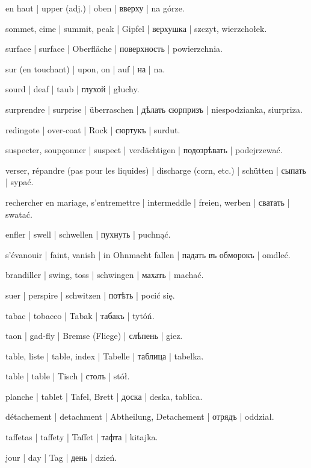 \begin{outdent}{1em}
en haut | upper (adj.) | oben | вверху | na górze.

\uvsubentry{}
sommet, cime | summit, peak | Gipfel | верхушка | szczyt, wierzchołek.


\uvsubentry{}
surface | surface | Oberfläche | поверхность | powierzchnia.

sur (en touchant) | upon, on | auf | на | na.

sourd | deaf | taub | глухой | głuchy.

surprendre | surprise | überraschen | дѣлать сюрпризъ | niespodzianka, siurpriza.

redingote | over-coat | Rock | сюртукъ | surdut.

suspecter, soupçonner | suspect | verdächtigen | подозрѣвать | podejrzewać.

verser, répandre (pas pour les liquides) | discharge (corn,
etc.) | schütten | сыпать | sypać.

rechercher en mariage, s’entremettre | intermeddle | freien,
werben | сватать | swatać.

enfler | swell | schwellen | пухнуть | puchnąć.

s’évanouir | faint, vanish | in Ohnmacht fallen | падать въ
обморокъ | omdleć.

brandiller | swing, toss | schwingen | махать | machać.

suer | perspire | schwitzen | потѣть | pocić się.


tabac | tobacco | Tabak | табакъ | tytóń.

taon | gad-fly | Bremse (Fliege) | слѣпень | giez.

table, liste | table, index | Tabelle | таблица | tabelka.

table | table | Tisch | столъ | stół.

planche | tablet | Tafel, Brett | доска | deska, tablica.

détachement | detachment | Abtheilung, Detachement | отрядъ | oddział.

taffetas | taffety | Taffet | тафта | kitajka.

jour | day | Tag | день | dzień.


\end{outdent}
